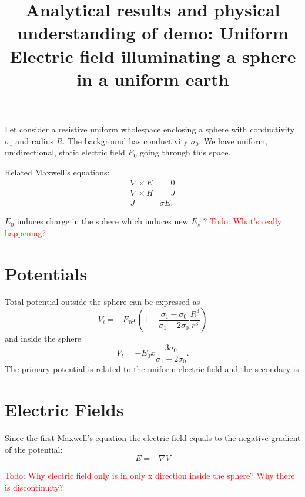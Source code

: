 \documentclass[11pt,letterpaper,leqno]{amsart}
\title{Analytical results and physical understanding of demo: Uniform Electric field illuminating a sphere in a uniform earth}
\newcommand{\TODO}[1]{\textcolor{red}{{\sc Todo:} #1}}
\numberwithin{equation}{section}
\begin{document}
\maketitle
\thispagestyle{empty}




\normalsize

\vspace{0.4cm}


Let consider a resistive uniform wholespace enclosing a sphere with conductivity $\sigma_1$ and radius $R$.  The background has conductivity $\sigma_0$. We have uniform, unidirectional, static electric field $E_0$ going through this space.

Related Maxwell's equations: 
\begin{equation}
\begin{aligned}
  \nabla \times E & = 0 \\
  \nabla\times H & = J \\
  J  =&  \sigma E.
\end{aligned}
\end{equation}

$E_0$ induces charge in the sphere which induces  new $E_s$  ?
\TODO{What's really happening? }

\section{Potentials}

Total potential outside the sphere can be expressed as   
\begin{equation}
V_t  = -E_0x (1-\frac{\sigma_1-\sigma_0}{\sigma_1+2\sigma_0} \frac{R^3}{r^3})
\end{equation}
and inside the sphere
\begin{equation}
 V_t= -E_0 x\frac{3 \sigma_0}{\sigma_1+2\sigma_0}.
 \end{equation}
The primary potential is related to the uniform electric field and the secondary is 

\section{Electric Fields}
Since the first Maxwell's equation the electric field equals to the negative gradient of the potential:
\begin{equation}\label{eq:Epotential}
E = -\nabla V
\end{equation}

\TODO{Why electric field only is in only x direction inside the sphere? Why there is discontinuity?}
\end{document}
